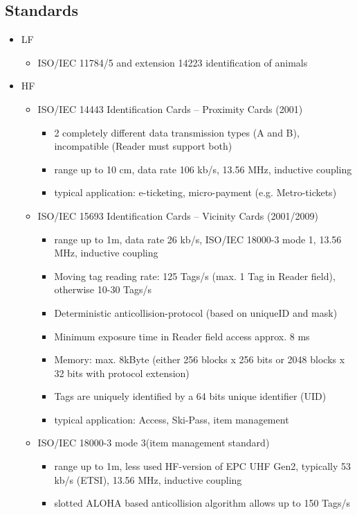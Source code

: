 \subsection{Standards}
	\begin{itemize}
		\item LF
			\begin{itemize}
				\item ISO/IEC 11784/5 and extension 14223 identification of animals
			\end{itemize} 
		\item HF
			\begin{itemize}
				\item ISO/IEC 14443	Identification Cards – Proximity Cards (2001) 
					\begin{itemize}
						\item 2 completely different data transmission types (A and B), incompatible (Reader must support both)
						\item range up to 10 cm, data rate 106 kb/s, 13.56 MHz, inductive coupling
						\item typical application: e-ticketing, micro-payment (e.g. Metro-tickets)
					\end{itemize}
				\item ISO/IEC 15693	Identification Cards – Vicinity Cards (2001/2009)
					\begin{itemize}
						\item range up to 1m, data rate 26 kb/s, ISO/IEC 18000-3 mode 1, 13.56 MHz, inductive coupling
						\item Moving tag reading rate: 125 Tags/s (max. 1 Tag in Reader field), otherwise 10-30 Tags/s
						\item Deterministic anticollision-protocol (based on uniqueID and mask)
						\item Minimum exposure time in Reader field access approx. 8 ms
						\item Memory: max. 8kByte (either 256 blocks x 256 bits or 2048 blocks x 32 bits with protocol extension)
						\item Tags are uniquely identified by a 64 bits unique identifier (UID)
						\item typical application: Access, Ski-Pass, item management
					\end{itemize}
				\item ISO/IEC 18000-3 mode 3(item management standard)
					\begin{itemize}
						\item range up to 1m, less used HF-version of EPC UHF Gen2, typically 53 kb/s (ETSI), 13.56 MHz, inductive coupling
						\item slotted ALOHA based anticollision algorithm allows up to 150 Tags/s
					\end{itemize}
						

\end{itemize}
\end{itemize}
